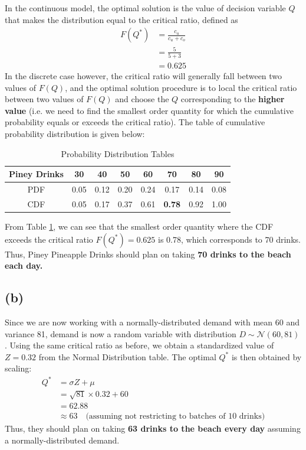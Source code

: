 \documentclass[12pt]{article}
\begin{document}
\noindent In the continuous model, the optimal solution is the value of decision variable $Q$ that makes the distribution equal to the critical ratio, defined as \begin{align*}
    F(Q^{*}) &= \frac{c_u}{c_u + c_o} \\ 
    &= \frac{5}{5+3} \\ 
    &= 0.625
\end{align*} In the discrete case however, the critical ratio will generally fall between two values of $F(Q)$, and the optimal solution procedure is to local the critical ratio between two values of $F(Q)$ and choose the $Q$ corresponding to the \textbf{higher value} (i.e. we need to find the smallest order quantity for which the cumulative probability equals or exceeds the critical ratio). The table of cumulative probability distribution is given below: \begin{table}[H]
    \centering
    \begin{tabular}{|c|c|c|c|c|c|c|c|} \hline 
        Piney Drinks & 30 & 40 & 50 & 60 & \textbf{70} & 80 & 90 \\ \hline 
        PDF & 0.05 & 0.12 & 0.20 & 0.24 & 0.17 & 0.14 & 0.08 \\ \hline \hline 
        CDF & 0.05 & 0.17 & 0.37 & 0.61 & \textbf{0.78} & 0.92 & 1.00 \\ \hline 
    \end{tabular}
    \caption{Probability Distribution Tables}
    \label{tab:1-cumprob}
\end{table} 

\noindent From Table \ref{tab:1-cumprob}, we can see that the smallest order quantity where the CDF exceeds the critical ratio $F(Q^{*}) = 0.625$ is 0.78, which corresponds to 70 drinks. Thus, Piney Pineapple Drinks should plan on taking \textbf{70 drinks to the beach each day.}

\subsection*{(b)}   


Since we are now working with a normally-distributed demand with mean 60 and variance 81, demand is now a random variable with distribution $D \sim \mathcal{N}(60, 81)$. Using the same critical ratio as before, we obtain a standardized value of $Z = 0.32$ from the Normal Distribution table. The optimal $Q^{*}$ is then obtained by scaling: \begin{align*}
    Q^{*} &= \sigma Z + \mu \\ 
    &= \sqrt{81} \times 0.32 + 60 \\ 
    &= 62.88 \\ 
    &\approx \boxed{63} \quad \text{(assuming not restricting to batches of 10 drinks)}
\end{align*} Thus, they should plan on taking \textbf{63 drinks to the beach every day} assuming a normally-distributed demand.
\end{document}
